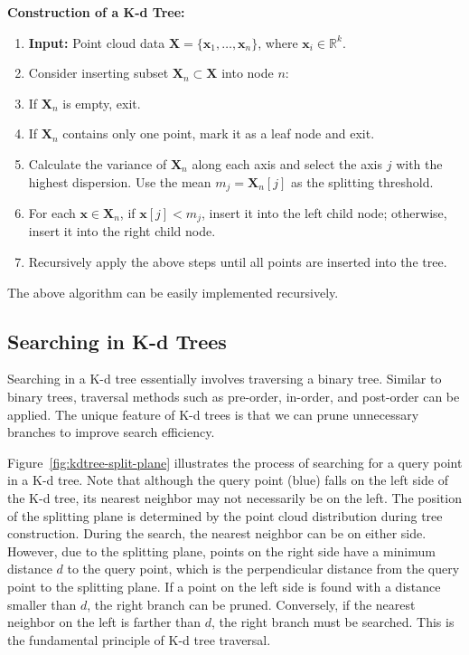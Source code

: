 \begin{mdframed}
	\textbf{Construction of a K-d Tree:}
	\begin{enumerate}
		\item \textbf{Input:} Point cloud data \(\mathbf{X} = \{\mathbf{x}_1, \ldots, \mathbf{x}_n\}\), where \(\mathbf{x}_i \in \mathbb{R}^{k}\).
		\item Consider inserting subset \(\mathbf{X}_n \subset \mathbf{X}\) into node \(n\):
		\item If \(\mathbf{X}_n\) is empty, exit.
		\item If \(\mathbf{X}_n\) contains only one point, mark it as a leaf node and exit.
		\item Calculate the variance of \(\mathbf{X}_n\) along each axis and select the axis \(j\) with the highest dispersion. Use the mean \(m_j = \mathbf{X}_n[j]\) as the splitting threshold.
		\item For each \(\mathbf{x} \in \mathbf{X}_n\), if \(\mathbf{x}[j] < m_j\), insert it into the left child node; otherwise, insert it into the right child node.
		\item Recursively apply the above steps until all points are inserted into the tree.
	\end{enumerate}
\end{mdframed}

The above algorithm can be easily implemented recursively.

\subsection{Searching in K-d Trees}
Searching in a K-d tree essentially involves traversing a binary tree. Similar to binary trees, traversal methods such as pre-order, in-order, and post-order can be applied. The unique feature of K-d trees is that we can prune unnecessary branches to improve search efficiency.

Figure~\ref{fig:kdtree-split-plane} illustrates the process of searching for a query point in a K-d tree. Note that although the query point (blue) falls on the left side of the K-d tree, its nearest neighbor may not necessarily be on the left. The position of the splitting plane is determined by the point cloud distribution during tree construction. During the search, the nearest neighbor can be on either side. However, due to the splitting plane, points on the right side have a minimum distance \(d\) to the query point, which is the perpendicular distance from the query point to the splitting plane. If a point on the left side is found with a distance smaller than \(d\), the right branch can be pruned. Conversely, if the nearest neighbor on the left is farther than \(d\), the right branch must be searched. This is the fundamental principle of K-d tree traversal.

